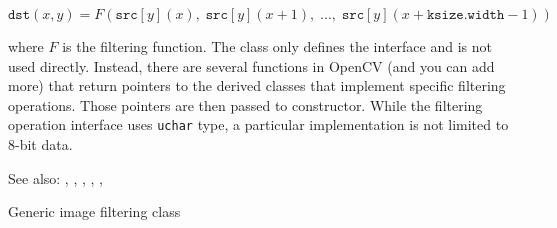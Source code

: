 \[\texttt{dst}(x,y) = F(\texttt{src}[y](x),\;\texttt{src}[y](x+1),\;...,\;\texttt{src}[y](x+\texttt{ksize.width}-1))\]

where $F$ is the filtering function. The class only defines the interface and is not used directly. Instead, there are several functions in OpenCV (and you can add more) that return pointers to the derived classes that implement specific filtering operations. Those pointers are then passed to  constructor. While the filtering operation interface uses \texttt{uchar} type, a particular implementation is not limited to 8-bit data.

See also: , , ,
 , , 

\label{FilterEngine}
Generic image filtering class

